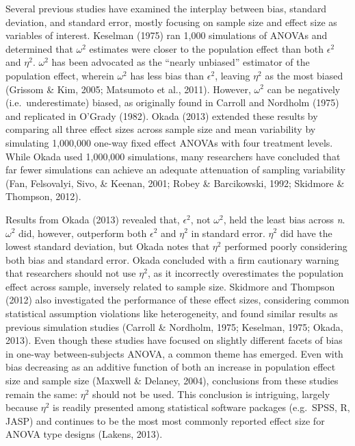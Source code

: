 \documentclass[english,man]{apa6}
\theoremstyle{definition}
\theoremstyle{definition}
\theoremstyle{definition}
\theoremstyle{remark}
\begin{document}
Several previous studies have examined the interplay between bias,
standard deviation, and standard error, mostly focusing on sample size
and effect size as variables of interest. Keselman (1975) ran 1,000
simulations of ANOVAs and determined that \(\omega^2\) estimates were
closer to the population effect than both \(\epsilon^2\) and \(\eta^2\).
\(\omega^2\) has been advocated as the \enquote{nearly unbiased}
estimator of the population effect, wherein \(\omega^2\) has less bias
than \(\epsilon^2\), leaving \(\eta^2\) as the most biased (Grissom \&
Kim, 2005; Matsumoto et al., 2011). However, \(\omega^2\) can be
negatively (i.e.~underestimate) biased, as originally found in Carroll
and Nordholm (1975) and replicated in O'Grady (1982). Okada (2013)
extended these results by comparing all three effect sizes across sample
size and mean variability by simulating 1,000,000 one-way fixed effect
ANOVAs with four treatment levels. While Okada used 1,000,000
simulations, many researchers have concluded that far fewer simulations
can achieve an adequate attenuation of sampling variability (Fan,
Felsovalyi, Sivo, \& Keenan, 2001; Robey \& Barcikowski, 1992; Skidmore
\& Thompson, 2012).

Results from Okada (2013) revealed that, \(\epsilon^2\), not
\(\omega^2\), held the least bias across \emph{n}. \(\omega^2\) did,
however, outperform both \(\epsilon^2\) and \(\eta^2\) in standard
error. \(\eta^2\) did have the lowest standard deviation, but Okada
notes that \(\eta^2\) performed poorly considering both bias and
standard error. Okada concluded with a firm cautionary warning that
researchers should not use \(\eta^2\), as it incorrectly overestimates
the population effect across sample, inversely related to sample size.
Skidmore and Thompson (2012) also investigated the performance of these
effect sizes, considering common statistical assumption violations like
heterogeneity, and found similar results as previous simulation studies
(Carroll \& Nordholm, 1975; Keselman, 1975; Okada, 2013). Even though
these studies have focused on slightly different facets of bias in
one-way between-subjects ANOVA, a common theme has emerged. Even with
bias decreasing as an additive function of both an increase in
population effect size and sample size (Maxwell \& Delaney, 2004),
conclusions from these studies remain the same: \(\eta^2\) should not be
used. This conclusion is intriguing, largely because \(\eta^2\) is
readily presented among statistical software packages (e.g.~SPSS, R,
JASP) and continues to be the most most commonly reported effect size
for ANOVA type designs (Lakens, 2013).
\end{document}

